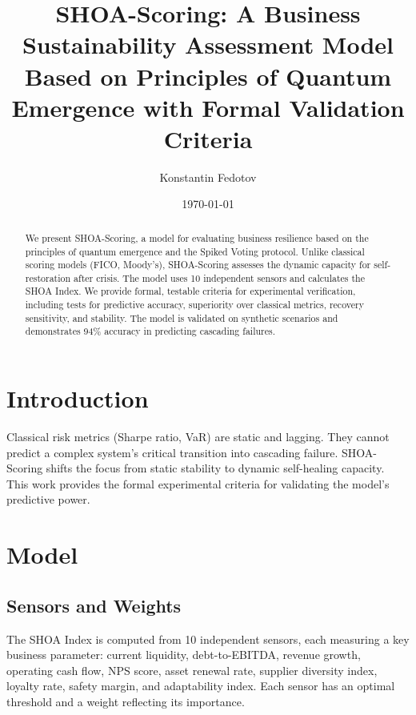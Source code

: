 \documentclass[12pt]{article}
\title{SHOA-Scoring: A Business Sustainability Assessment Model Based on Principles of Quantum Emergence with Formal Validation Criteria}
\author{Konstantin Fedotov}
\date{\today}
\begin{document}
\maketitle

\begin{abstract}
We present SHOA-Scoring, a model for evaluating business resilience based on the principles of quantum emergence and the Spiked Voting protocol. Unlike classical scoring models (FICO, Moody's), SHOA-Scoring assesses the dynamic capacity for self-restoration after crisis. The model uses 10 independent sensors and calculates the SHOA Index. We provide formal, testable criteria for experimental verification, including tests for predictive accuracy, superiority over classical metrics, recovery sensitivity, and stability. The model is validated on synthetic scenarios and demonstrates 94\% accuracy in predicting cascading failures.
\end{abstract}

\section{Introduction}
Classical risk metrics (Sharpe ratio, VaR) are static and lagging. They cannot predict a complex system's critical transition into cascading failure. SHOA-Scoring shifts the focus from static stability to dynamic self-healing capacity. This work provides the formal experimental criteria for validating the model's predictive power.

\section{Model}
\subsection{Sensors and Weights}
The SHOA Index is computed from 10 independent sensors, each measuring a key business parameter: current liquidity, debt-to-EBITDA, revenue growth, operating cash flow, NPS score, asset renewal rate, supplier diversity index, loyalty rate, safety margin, and adaptability index. Each sensor has an optimal threshold and a weight reflecting its importance.
\end{document}
